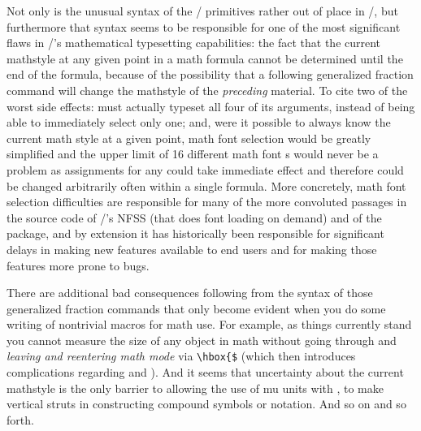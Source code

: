 \documentclass{amsdtx}
\begin{document}
Not only is the unusual syntax of the \tex/ primitives rather out of
place in \latex/, but furthermore that syntax seems to be responsible
for one of the most significant flaws in \tex/'s mathematical
typesetting capabilities: the fact that the current mathstyle at any
given point in a math formula cannot be determined until the end of the
formula, because of the possibility that a following generalized
fraction command will change the mathstyle of the \emph{preceding}
material. To cite two of the worst side effects:  must
actually typeset all four of its arguments, instead of being able to
immediately select only one; and, were it possible to always know the
current math style at a given point, math font selection would be
greatly simplified and the upper limit of 16 different math font
s would never be a problem as 
assignments for any  could take immediate effect and therefore
could be changed arbitrarily often within a single formula. More
concretely, math font selection difficulties are responsible for many of
the more convoluted passages in the source code of \latex/'s NFSS (that
does font loading on demand) and of the  package, and by
extension it has historically been responsible for significant delays in
making new features available to end users and for making those features
more prone to bugs.

There are additional bad consequences following from the syntax of those
generalized fraction commands that only become evident when you do some
writing of nontrivial macros for math use. For example, as things
currently stand you cannot measure the size of any object in math
without going through  and \emph{leaving and reentering
math mode} via \verb'\hbox{$' (which then introduces complications
regarding  and ). And it seems that
uncertainty about the current mathstyle is the only barrier to allowing
the use of mu units with , to make vertical struts in
constructing compound symbols or notation. And so on and so forth.
\end{document}
